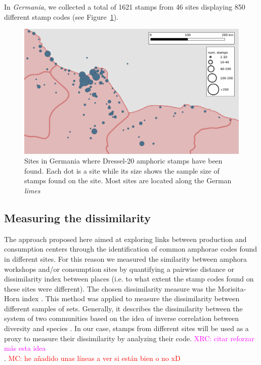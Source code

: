 \documentclass[review]{elsarticle}
\newcommand{\memo}[2]{\textcolor{#1}{#2}}
\newcommand{\maria}[1]{\memo{red}{MC: #1\\}}
\newcommand{\xavi}[1]{\memo{magenta}{XRC: #1\\}}
\begin{document}

In \textit{Germania}, we collected a total of 1621 stamps from 46 sites displaying 850 different stamp codes (see Figure~\ref{germania}). 


\begin{figure}[htp]
	\centering
\includegraphics[width=\linewidth]{figs/germania}
\caption{Sites in Germania where Dressel-20 amphoric stamps have been found. Each dot is a site while its size shows the sample size of stamps found on the site. Most sites are located along the German \textit{limes}}
\label{germania}
\end{figure}


\subsection{Measuring the dissimilarity}



The approach proposed here aimed at exploring links between production and consumption centers through the identification of common amphorae codes found in different sites. For this reason we measured the similarity between amphora workshops and/or consumption sites by quantifying a pairwise distance or dissimilarity index between places (i.e. to what extent the stamp codes found on these sites were different). The chosen dissimilarity measure was the Morisita-Horn index \citep{morisita_measuring_1959, horn_measurement_1966}. This method was applied to measure the dissimilarity between different samples of sets. Generally, it describes the dissimilarity between the system of two communities based on the idea of inverse correlation between diversity and species \citep{magurran_why_1988}. In our case, stamps from different sites will be used as a proxy to measure their dissimilarity by analyzing their code. 
\xavi{citar reforzar más esta idea}.
\maria{he añadido unas líneas a ver si están bien o no xD}
\end{document}

